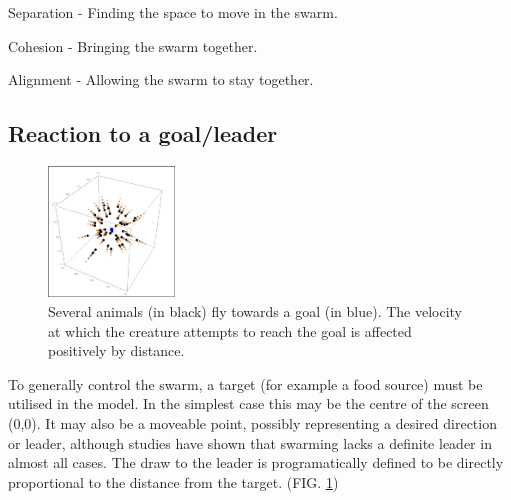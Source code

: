 \documentclass[
reprint,
showpacs,preprintnumbers,
amsmath,amssymb,
prl,
]{revtex4-1}
\begin{document}
\begin{description}
		\item{Separation - Finding the space to move in the swarm.}
		\item{Cohesion - Bringing the swarm together.}
		\item{Alignment - Allowing the swarm to stay together.}
\end{description}

\subsection{\label{sec:level2}Reaction to a goal/leader}

\begin{figure}[!htp]
	\includegraphics[width=0.3\textwidth]{images/leader.png}

	\caption{
		Several animals (in black) fly towards a goal (in blue).
		The velocity at which the creature attempts to reach the goal is affected positively by distance.
	}

	\label{fig:boidleader}
\end{figure}

To generally control the swarm, a target (for example a food source) must be utilised in the model.
In the simplest case this may be the centre of the screen (0,0).
It may also be a moveable point, possibly representing a desired direction or leader, although studies have shown that swarming lacks a definite leader in almost all cases.\cite{modellingflocks}
The draw to the leader is programatically defined to be directly proportional to the distance from the target. (FIG. \ref{fig:boidleader})
\end{document}
